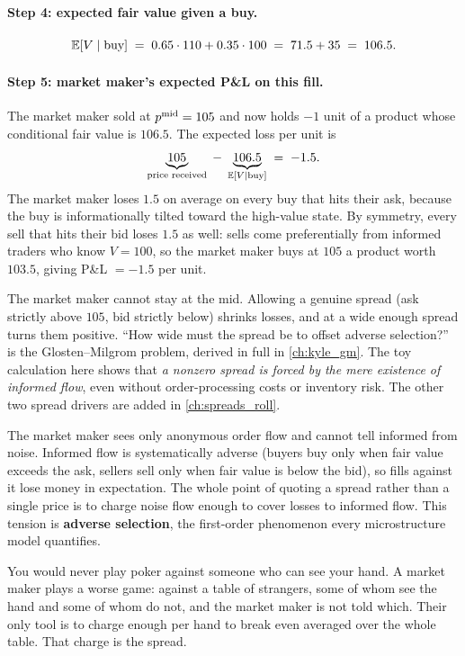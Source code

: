 \paragraph{Step 4: expected fair value given a buy.}
\[
  \mathbb{E}[V \mid \text{buy}]
    \;=\; 0.65 \cdot 110 + 0.35 \cdot 100
    \;=\; 71.5 + 35 \;=\; 106.5.
\]

\paragraph{Step 5: market maker's expected P\&L on this fill.}
The market maker sold at $p^{\mathrm{mid}} = 105$ and now holds $-1$ unit of a
product whose conditional fair value is $106.5$. The expected loss
per unit is
\[
  \underbrace{105}_{\text{price received}}
    \;-\; \underbrace{106.5}_{\mathbb{E}[V \mid \text{buy}]}
    \;=\; -1.5.
\]
The market maker loses $1.5$ on average on every buy that hits their
ask, because the buy is informationally tilted toward the high-value
state. By symmetry, every sell that hits their bid loses $1.5$ as
well: sells come preferentially from informed traders who know $V =
100$, so the market maker buys at $105$ a product worth $103.5$,
giving P\&L $= -1.5$ per unit.

The market maker cannot stay at the mid. Allowing a genuine spread
(ask strictly above $105$, bid strictly below) shrinks losses,
and at a wide enough spread turns them positive. ``How wide must the
spread be to offset adverse selection?'' is the Glosten--Milgrom
problem, derived in full in \cref{ch:kyle_gm}. The toy calculation
here shows that \emph{a nonzero spread is forced by the mere
existence of informed flow}, even without order-processing costs or
inventory risk. The other two spread drivers are added in
\cref{ch:spreads_roll}.

\begin{keyfactbox}
The market maker sees only anonymous order flow and cannot tell
informed from noise. Informed flow is systematically adverse (buyers
buy only when fair value exceeds the ask, sellers sell only when fair
value is below the bid), so fills against it lose money in
expectation. The whole point of quoting a spread rather than a single
price is to charge noise flow enough to cover losses to informed
flow. This tension is \textbf{adverse selection}, the first-order
phenomenon every microstructure model quantifies.
\end{keyfactbox}

\begin{intuitionbox}
You would never play poker against someone who can see your hand. A
market maker plays a worse game: against a table of strangers, some
of whom see the hand and some of whom do not, and the market maker is
not told which. Their only tool is to charge enough per hand to break
even averaged over the whole table. That charge is the spread.
\end{intuitionbox}

